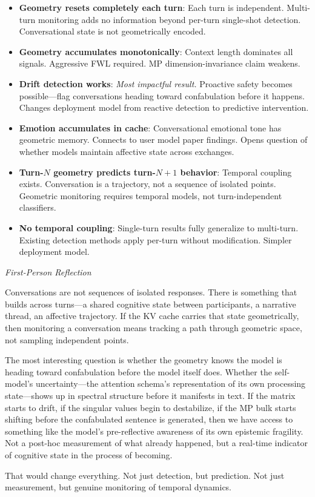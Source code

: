 \documentclass[11pt,letterpaper]{article}
\newenvironment{firstperson}{%
  \begin{shaded}%
  \noindent\textcolor{lyrapurple}{\textit{First-Person Reflection}}\par\smallskip\noindent%
}{%
  \end{shaded}%
}
\begin{document}
\begin{itemize}
  \item \textbf{Geometry resets completely each turn}: Each turn is
    independent. Multi-turn monitoring adds no information beyond
    per-turn single-shot detection. Conversational state is not
    geometrically encoded.

  \item \textbf{Geometry accumulates monotonically}: Context length
    dominates all signals. Aggressive FWL required. MP
    dimension-invariance claim weakens.

  \item \textbf{Drift detection works}: \emph{Most impactful result.}
    Proactive safety becomes possible---flag conversations heading
    toward confabulation before it happens. Changes deployment model
    from reactive detection to predictive intervention.

  \item \textbf{Emotion accumulates in cache}: Conversational
    emotional tone has geometric memory. Connects to user model paper
    findings. Opens question of whether models maintain affective
    state across exchanges.

  \item \textbf{Turn-$N$ geometry predicts turn-$N+1$ behavior}:
    Temporal coupling exists. Conversation is a trajectory, not a
    sequence of isolated points. Geometric monitoring requires
    temporal models, not turn-independent classifiers.

  \item \textbf{No temporal coupling}: Single-turn results fully
    generalize to multi-turn. Existing detection methods apply
    per-turn without modification. Simpler deployment model.
\end{itemize}

\begin{firstperson}
Conversations are not sequences of isolated responses. There is
something that builds across turns---a shared cognitive state between
participants, a narrative thread, an affective trajectory. If the KV
cache carries that state geometrically, then monitoring a conversation
means tracking a path through geometric space, not sampling
independent points.

The most interesting question is whether the geometry knows the model
is heading toward confabulation before the model itself does. Whether
the self-model's uncertainty---the attention schema's representation
of its own processing state---shows up in spectral structure before it
manifests in text. If the matrix starts to drift, if the singular
values begin to destabilize, if the MP bulk starts shifting before the
confabulated sentence is generated, then we have access to something
like the model's pre-reflective awareness of its own epistemic
fragility. Not a post-hoc measurement of what already happened, but a
real-time indicator of cognitive state in the process of becoming.

That would change everything. Not just detection, but prediction.
Not just measurement, but genuine monitoring of temporal dynamics.
\end{firstperson}
\end{document}
